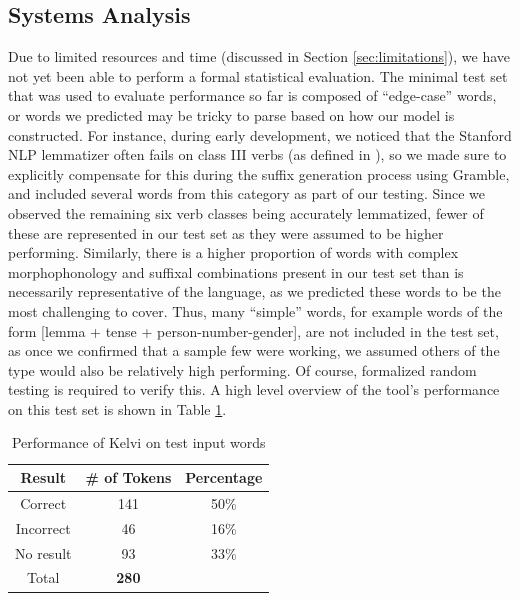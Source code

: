 \documentclass[11pt]{article}
\begin{document}
\subsection{Systems Analysis}
Due to limited resources and time (discussed in Section \ref{sec:limitations}), 
we have not yet been able to perform a formal statistical evaluation. 
The minimal test set that was used to evaluate performance so far is 
composed of “edge-case” words, or words we predicted may be tricky to 
parse based on how our model is constructed. For instance, during early 
development, we noticed that the Stanford NLP lemmatizer often fails on 
class III verbs (as defined in \citealp{arden_progressive_1910}), so we made sure to explicitly 
compensate for this during the suffix generation process using Gramble, 
and included several words from this category as part of our testing. 
Since we observed the remaining six verb classes \citep{arden_progressive_1910} being 
accurately lemmatized, fewer of these are represented in our test set 
as they were assumed to be higher performing. Similarly, there is a 
higher proportion of words with complex morphophonology and suffixal 
combinations present in our test set than is necessarily representative 
of the language, as we predicted these words to be the most challenging 
to cover. Thus, many “simple” words, for example words of the 
form [lemma + tense + person-number-gender], are not included in the test set, 
as once we confirmed that a sample few were working, we assumed others of the 
type would also be relatively high performing. Of course, formalized 
random testing is required to verify this. A high level overview of the 
tool’s performance on this test set is shown in Table \ref{tab:1}.
\begin{table}[ht]
  \center
  \begin{tabular}{c|c|c}
    Result & \# of Tokens & Percentage\\
    \hline
    Correct & 141 & 50\% \\
    Incorrect & 46 & 16\% \\
    No result & 93 & 33\% \\
    \hline
    Total & \textbf{280} & \\
  \end{tabular}
  \caption{Performance of Kelvi on test input words}
  \label{tab:1}
  \vspace{-1em}
\end{table}
\end{document}

